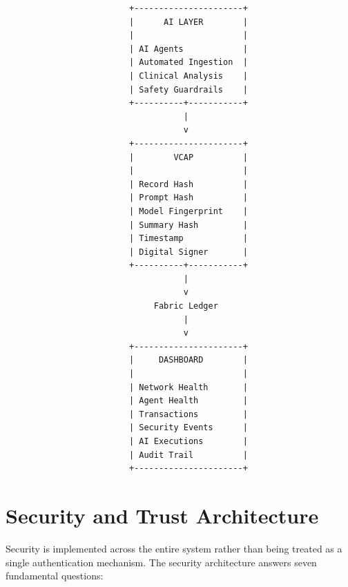 \documentclass[11pt,a4paper]{article}
\begin{document}
\begin{lstlisting}
                         +----------------------+
                         |      AI LAYER        |
                         |                      |
                         | AI Agents            |
                         | Automated Ingestion  |
                         | Clinical Analysis    |
                         | Safety Guardrails    |
                         +----------+-----------+
                                    |
                                    v
                         +----------------------+
                         |        VCAP          |
                         |                      |
                         | Record Hash          |
                         | Prompt Hash          |
                         | Model Fingerprint    |
                         | Summary Hash         |
                         | Timestamp            |
                         | Digital Signer       |
                         +----------+-----------+
                                    |
                                    v
                              Fabric Ledger
                                    |
                                    v
                         +----------------------+
                         |     DASHBOARD        |
                         |                      |
                         | Network Health       |
                         | Agent Health         |
                         | Transactions         |
                         | Security Events      |
                         | AI Executions        |
                         | Audit Trail          |
                         +----------------------+
\end{lstlisting}

\newpage
\section{Security and Trust Architecture}

Security is implemented across the entire system rather than being treated as a single authentication mechanism. The security architecture answers seven fundamental questions:
\end{document}
